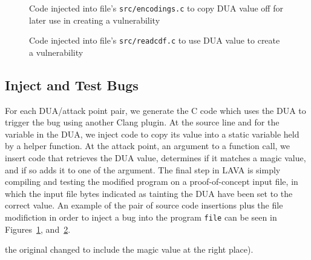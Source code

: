 \begin{figure}

\caption{Code injected into file's \texttt{src/encodings.c} to copy DUA value off for later use in creating a vulnerability}
\label{src:dua-siphon}
\end{figure}

\begin{figure}

\caption{Code injected into file's \texttt{src/readcdf.c} to use DUA value to create a vulnerability}
\label{src:dua-use}
\end{figure}

\subsection{Inject and Test Bugs}
For each DUA/attack point pair, we generate the C code which uses the DUA to trigger the bug using another Clang plugin.
At the source line and for the variable in the DUA, we inject code to copy its value into a static variable held by a helper function.
At the attack point, an argument to a function call, we insert code that retrieves the DUA value, determines if it matches a magic value, and if so adds it to one of the argument.
The final step in LAVA is simply compiling and testing the modified program on a proof-of-concept input file, in which the input file bytes indicated as tainting the DUA have been set to the correct value.
An example of the pair of source code insertions plus the file modifiction in order to inject a bug into the program \verb+file+ can be seen in Figures~\ref{src:dua-siphon}, and~\ref{src:dua-use}.




the original changed to include the magic value at the right place).
